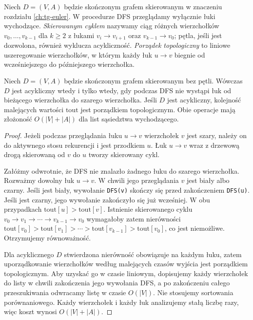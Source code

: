 Niech $D=(V,A)$ będzie skończonym grafem
skierowanym w znaczeniu rozdziału
\ref{ch:tg-euler}. W procedurze DFS przeglądamy
wyłącznie łuki wychodzące.
\emph{Skierowanym cyklem} nazywamy
ciąg różnych wierzchołków
$v_0,\ldots,v_{k-1}$ dla $k\geq2$
z łukami $v_i\to v_{i+1}$ oraz
$v_{k-1}\to v_0$; pętla, jeśli jest
dozwolona, również wyklucza acykliczność.
\emph{Porządek topologiczny} to liniowe
uszeregowanie wierzchołków, w którym
każdy łuk $u\to v$ biegnie od
wcześniejszego do późniejszego wierzchołka.

\begin{twierdzenie}
\label{thm:tg-dfs-dag}
Niech $D=(V,A)$ będzie skończonym grafem
skierowanym bez pętli.
Wówczas $D$ jest acykliczny wtedy i tylko
wtedy, gdy podczas DFS nie wystąpi łuk
od bieżącego wierzchołka do szarego
wierzchołka. Jeśli $D$ jest acykliczny,
kolejność malejących wartości
$\mathrm{tout}$ jest porządkiem
topologicznym. Obie operacje mają
złożoność $O(|V|+|A|)$ dla list
sąsiedztwa wychodzącego.
\end{twierdzenie}
\begin{proof}
Jeżeli podczas przeglądania łuku $u\to v$
wierzchołek $v$ jest szary, należy on
do aktywnego stosu rekurencji i jest
przodkiem $u$. Łuk $u\to v$ wraz
z drzewową drogą skierowaną od $v$ do $u$
tworzy skierowany cykl.

Załóżmy odwrotnie, że DFS nie znalazło
żadnego łuku do szarego wierzchołka.
Rozważmy dowolny łuk $u\to v$.
W chwili jego przeglądania $v$ jest biały
albo czarny. Jeśli jest biały, wywołanie
\texttt{DFS(v)} skończy się przed zakończeniem
\texttt{DFS(u)}. Jeśli jest czarny, jego
wywołanie zakończyło się już wcześniej.
W obu przypadkach
$\mathrm{tout}[u]>\mathrm{tout}[v]$.
Istnienie skierowanego cyklu
$v_0\to v_1\to\cdots\to v_{k-1}\to v_0$
wymagałoby zatem nierówności
$\mathrm{tout}[v_0]>\mathrm{tout}[v_1]>
\cdots>\mathrm{tout}[v_{k-1}]>
\mathrm{tout}[v_0]$, co jest niemożliwe.
Otrzymujemy równoważność.

Dla acyklicznego $D$ stwierdzona
nierówność obowiązuje na każdym łuku,
zatem uporządkowanie wierzchołków
według malejących czasów wyjścia
jest porządkiem topologicznym.
Aby uzyskać go w czasie liniowym, dopisujemy każdy wierzchołek
do listy w chwili zakończenia jego wywołania DFS, a po zakończeniu
całego przeszukiwania odwracamy listę w czasie $O(|V|)$.
Nie stosujemy sortowania porównaniowego.
Każdy wierzchołek i każdy łuk
analizujemy stałą liczbę razy,
więc koszt wynosi $O(|V|+|A|)$.
\end{proof}

